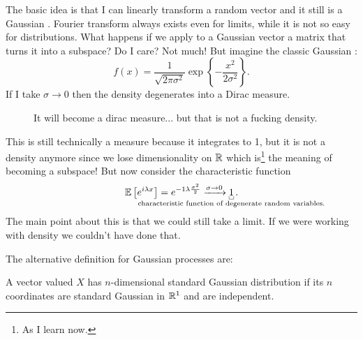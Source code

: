 \documentclass[12pt]{report}
\begin{document}
The basic idea is that I can linearly transform a random vector and it still is a Gaussian \rv. Fourier transform always exists even for limits, while it is not so easy for distributions. What happens if we apply to a Gaussian vector a matrix that turns it into a subspace? Do I care? Not much! But imagine the classic Gaussian \rv:
\begin{equation*}
	f(x)=\frac{1}{\sqrt{2\pi \sigma^{2}}}\exp\left\{-\frac{x^{2}}{2\sigma^{2}}\right\}.
\end{equation*}
If I take $\sigma\to0$ then the density degenerates into a Dirac measure.
\begin{figure}[h]
	\centering
	\label{fig:gaugau}
	\caption{It will become a dirac measure... but that is not a fucking density.}
\end{figure}
This is still technically a measure because it integrates to 1, but it is not a density anymore since we lose dimensionality on $\mathbb{R}$ which is\footnote{As I learn now.} the meaning of becoming a subspace! But now consider the characteristic function
\begin{equation*}
	\evs\left[e^{i\lambda x}\right]=e^{-1\lambda\frac{\sigma^{2}}{2}}\xrightarrow{\sigma\to0}\ubracketthin{1}_{\claptext{characteristic function of degenerate \rv s.}}.
\end{equation*}
The main point about this is that we could still take a limit. If we were working with density we couldn't have done that.\par
The alternative definition for Gaussian processes are:
\begin{definition}
	A vector valued \rv{} $X$ has $n$-dimensional standard Gaussian distribution if its $n$ coordinates are standard Gaussian in $\mathbb{R}^{1}$ and are independent.
\end{definition} 
\end{document}
